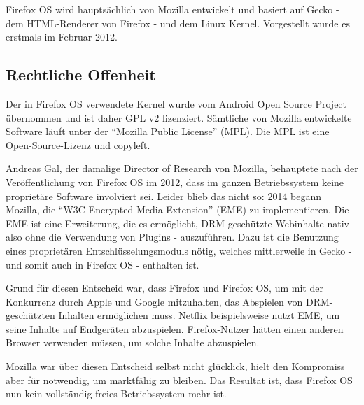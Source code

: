 Firefox OS wird hauptsächlich von Mozilla entwickelt und basiert auf Gecko - dem HTML-Renderer von Firefox - und dem Linux Kernel\cite{online:ff-architecture}. Vorgestellt wurde es erstmals im Februar 2012\cite{online:ff-techhive-b2g}.\\

\subsection{Rechtliche Offenheit}
Der in Firefox OS verwendete Kernel wurde vom Android Open Source Project übernommen und ist daher GPL v2 lizenziert\cite{online:kernel-license}. Sämtliche von Mozilla entwickelte Software läuft unter der ``Mozilla Public License'' (MPL)\cite{online:mozilla-licensing}. Die MPL ist eine Open-Source-Lizenz und copyleft\cite{online:mpl}.

Andreas Gal, der damalige Director of Research von Mozilla, behauptete nach der Veröffentlichung von Firefox OS im 2012, dass im ganzen Betriebssystem keine proprietäre Software involviert sei\cite{online:knowyourmobile-b2g}. Leider blieb das nicht so: 2014 begann Mozilla, die ``W3C Encrypted Media Extension'' (EME) zu implementieren\cite{online:mozilla-eme}. Die EME  ist eine Erweiterung, die es ermöglicht, DRM-geschützte Webinhalte nativ - also ohne die Verwendung von Plugins - auszuführen. Dazu ist die Benutzung eines proprietären Entschlüsselungsmoduls nötig\cite{online:mozilla-eme}, welches mittlerweile in Gecko - und somit auch in Firefox OS - enthalten ist.

Grund für diesen Entscheid war, dass Firefox und Firefox OS, um mit der Konkurrenz durch Apple und Google mitzuhalten, das Abspielen von DRM-geschützten Inhalten ermöglichen muss. Netflix beispielsweise nutzt EME, um seine Inhalte auf Endgeräten abzuspielen. Firefox-Nutzer hätten einen anderen Browser verwenden müssen, um solche Inhalte abzuspielen\cite{online:mozilla-eme}.

Mozilla war über diesen Entscheid selbst nicht glücklick\cite{online:ff-drm-implementation}, hielt den Kompromiss aber für notwendig, um marktfähig zu bleiben. Das Resultat ist, dass Firefox OS nun kein vollständig freies Betriebssystem mehr ist. \\


